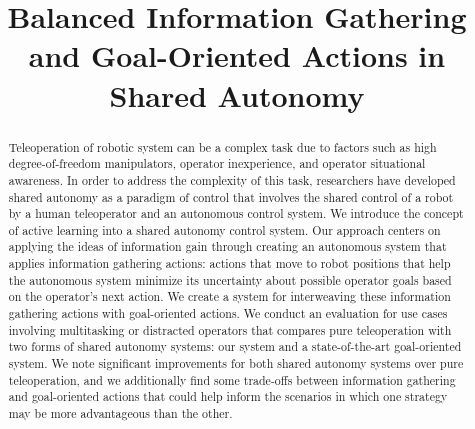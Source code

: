 \documentclass[conference]{IEEEtran}
\begin{document}
\title{Balanced Information Gathering and Goal-Oriented Actions in Shared Autonomy\\%
}


\author{}

\maketitle

\begin{abstract}
Teleoperation of robotic system can be a complex task due to factors such as high degree-of-freedom manipulators, operator inexperience, and operator situational awareness. In order to address the complexity of this task, researchers have developed shared autonomy as a paradigm of control that involves the shared control of a robot by a human teleoperator and an autonomous control system. We introduce the concept of active learning into a shared autonomy control system. Our approach centers on applying the ideas of information gain through creating an autonomous system that applies information gathering actions: actions that move to robot positions that help the autonomous system minimize its uncertainty about possible operator goals based on the operator's next action. We create a system for interweaving these information gathering actions with goal-oriented actions. We conduct an evaluation for use cases involving multitasking or distracted operators that compares pure teleoperation with two forms of shared autonomy systems: our system and a state-of-the-art goal-oriented system. We note significant improvements for both shared autonomy systems over pure teleoperation, and we additionally find some trade-offs between information gathering and goal-oriented actions that could help inform the scenarios in which one strategy may be more advantageous than the other.
\end{abstract}
\end{document}
